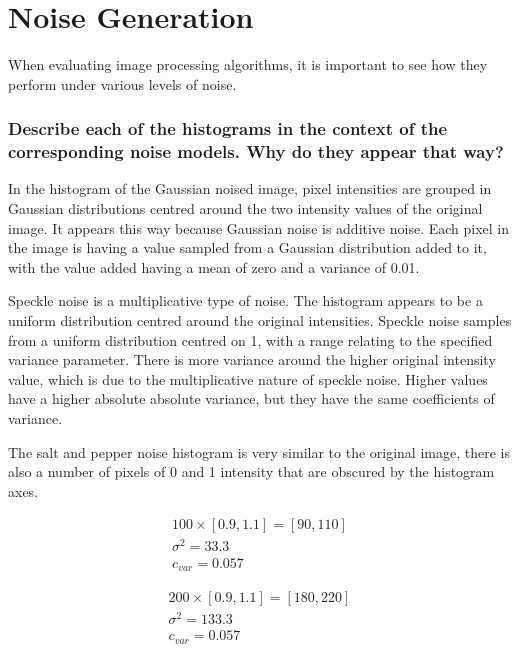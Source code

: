 \section{Noise Generation}

When evaluating image processing algorithms, it is important to see how they perform under various levels of noise.


\begin{figure}[ht]
\centering
\end{figure}


\subsubsection{Describe each of the histograms in the context of the corresponding noise models. Why do they appear that way?}
In the histogram of the Gaussian noised image, pixel intensities are grouped in Gaussian distributions centred around the two intensity values of the original image. It appears this way because Gaussian noise is additive noise. Each pixel in the image is having a value sampled from a Gaussian distribution added to it, with the value added having a mean of zero and a variance of 0.01.

Speckle noise is a multiplicative type of noise. The histogram appears to be a uniform distribution centred around the original intensities. Speckle noise samples from a uniform distribution centred on 1, with a range relating to the specified variance parameter. There is more variance around the higher original intensity value, which is due to the multiplicative nature of speckle noise. Higher values have a higher absolute absolute variance, but they have the same coefficients of variance.

The salt and pepper noise histogram is very similar to the original image, there is also a number of pixels of 0 and 1 intensity that are obscured by the histogram axes.

\begin{eqnarray}
100 \times \left [ 0.9, 1.1 \right ] = \left [ 90, 110 \right ] \\
{\sigma}^{2} = 33.3 \nonumber \\
{c}_{var} = 0.057 \nonumber
\end{eqnarray}

\begin{eqnarray}
200 \times \left [ 0.9, 1.1 \right ] = \left [ 180, 220 \right ] \\
{\sigma}^{2} = 133.3 \nonumber \\
{c}_{var} = 0.057 \nonumber
\end{eqnarray}

